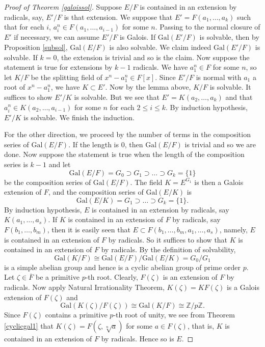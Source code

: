\documentclass[12pt]{report}
\theoremstyle{definition}
\newcommand{\gal}{\text{Gal}}
\newcommand{\zz}{\mathbb{Z}}
\begin{document}
\begin{proof}[Proof of Theorem \ref{galoissol}]
	Suppose $E/F$ is contained in an extension by radicals, say, $E'/F$ is that extension. We suppose that $E'=F(a_1,\dots,a_k)$ such that for each $i$, $a_i^n\in F(a_1,\dots,a_{i-1})$ for some $n$. Passing to the normal closure of $E'$ if necessary, we can assume $E'/F$ is Galois. If $\gal(E'/F)$ is solvable, then by Proposition \ref{subsol}, $\gal(E/F)$ is also solvable. We claim indeed $\gal(E'/F)$ is solvable. If $k=0$, the extension is trivial and so is the claim. Now suppose the statement is true for extensions by $k-1$ radicals. We have $a_1^n\in F$ for some $n$, so let $K/F$ be the splitting field of $x^n-a_1^n\in F[x]$. Since $E'/F$ is normal with $a_1$ a root of $x^n-a_1^n$, we have $K\subset E'$. Now by the lemma above, $K/F$ is solvable. It suffices to show $E'/K$ is solvable. But we see that $E'=K(a_2,\dots,a_k)$ and that $a_i^n\in K(a_2,\dots,a_{i-1})$ for some $n$ for each $2\leq i\leq k$. By induction hypothesis, $E'/K$ is solvable. We finish the induction.


	For the other direction, we proceed by the number of terms in the composition series of $\gal(E/F)$. If the length is 0, then $\gal(E/F)$ is trivial and so we are done.
	Now suppose the statement is true when the length of the composition series is $k-1$ and let
	\[\gal(E/F)=G_0\supset G_1\supset \dots\supset G_k=\{1\}\] be the composition series of $\gal(E/F)$. The field $K=E^{G_1}$ is then a Galois extension of $F$, and the composition series of $\gal(E/K)$ is \[\gal(E/K)=G_1\supset \dots\supset G_k=\{1\}.\]
	By induction hypothesis, $E$ is contained in an extension by radicals, say $K(a_1,\dots,a_s)$. If $K$ is contained in an extension of $F$ by radicals, say $F(b_1,\dots,b_m)$, then it is easily seen that $E\subset F(b_1,\dots,b_m,a_1,\dots,a_s)$, namely, $E$ is contained in an extension of $F$ by radicals. So it suffices to show that $K$ is contained in an extension of $F$ by radicals. By the definition of solvability, \[\gal(K/F)\cong \gal(E/F)/\gal(E/K) = G_0/G_1\]
	is a simple abelian group and hence is a cyclic abelian group of prime order $p$. Let $\zeta\in \overline{F}$ be a primitive $p$-th root. Clearly, $F(\zeta)$ is an extension of $F$ by radicals. Now apply Natural Irrationality Theorem, $K(\zeta)=KF(\zeta)$ is a Galois extension of $F(\zeta)$ and \[\gal(K(\zeta)/F(\zeta))\cong \gal(K/F)\cong \zz/p\zz.\] Since $F(\zeta)$ contains a primitive $p$-th root of unity, we see from Theorem \ref{cyclicgal1} that $K(\zeta)=F(\zeta, \sqrt[n]{a})$ for some $a\in F(\zeta)$, that is, $K$ is contained in an extension of $F$ by radicals. Hence so is $E$.
\end{proof}
\end{document}
